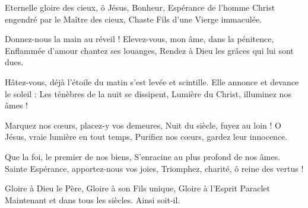 Eternelle gloire des cieux, ô Jésus,
Bonheur, Espérance de l'homme
Christ engendré par le Maître des cieux,
Chaste Fils d'une Vierge immaculée.

Donnez-nous la main au réveil !
Elevez-vous, mon âme, dans la pénitence,
Enflammée d'amour chantez ses louanges,
Rendez à Dieu les grâces qui lui sont dues.

Hâtez-vous, déjà l'étoile du matin s'est levée et scintille.
Elle annonce et devance le soleil :
Les ténèbres de la nuit se dissipent,
Lumière du Christ, illuminez nos âmes !

Marquez nos cœurs, placez-y vos demeures,
Nuit du siècle, fuyez au loin !
O Jésus, vraie lumière en tout temps,
Purifiez nos cœurs, gardez leur innocence.

Que la foi, le premier de nos biens,
S'enracine au plus profond de nos âmes.
Sainte Espérance, apportez-nous vos joies,
Triomphez, charité, ô reine des vertus !

Gloire à Dieu le Père,
Gloire à son Fils unique,
Gloire à l'Esprit Paraclet
Maintenant et dans tous les siècles.
Ainsi soit-il.